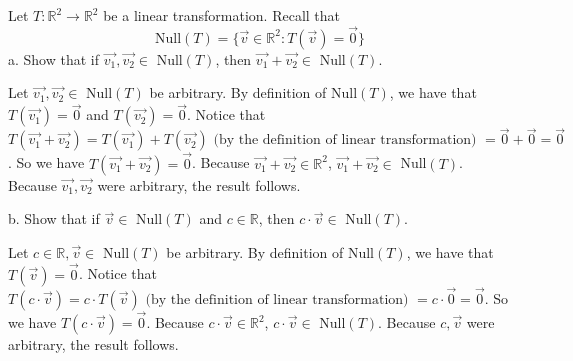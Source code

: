 \documentclass[12pt]{article}
\newenvironment{problem}[2][Problem]
{
	\begin{trivlist} 
		\item[\hskip \labelsep {\bfseries #1 #2:}]
	}
{
	\end{trivlist}
	}
\newenvironment{solution}[1][Solution]
{
	\begin{trivlist} 
		\item[\hskip \labelsep {\itshape #1:}]
	}
	{
	\end{trivlist}
}
\begin{document}
\newpage
\begin{problem}{2}
Let $T:\mathbb{R}^2 \to \mathbb{R}^2$ be a linear transformation. Recall that
\[
\text{Null}(T)=\{ \vec{v} \in \mathbb{R}^2: T(\vec{v})=\vec{0} \}
\]
\noindent
\newline
\newline
a. Show that if $\vec{v_{1}},\vec{v_{2}} \in$ Null$(T)$, then $\vec{v_{1}}+\vec{v_{2}} \in$ Null$(T)$.
\begin{solution}
Let $\vec{v_{1}},\vec{v_{2}} \in$ Null$(T)$ be arbitrary. By definition of Null$(T)$, we have that $T(\vec{v_{1}})=\vec{0}$ and $T(\vec{v_{2}})=\vec{0}$. Notice that
$T(\vec{v_{1}}+\vec{v_{2}}) = T(\vec{v_{1}}) + T(\vec{v_{2}}) \text{ (by the definition of linear transformation) } = \vec{0} + \vec{0} = \vec{0}$. So we have $T(\vec{v_{1}}+\vec{v_{2}}) = \vec{0}$. Because $\vec{v_{1}}+\vec{v_{2}} \in \mathbb{R}^2$, $\vec{v_{1}}+\vec{v_{2}} \in$ Null$(T)$. Because $\vec{v_{1}},\vec{v_{2}}$ were arbitrary, the result follows.
\end{solution}
\noindent
\newline
\newline
b. Show that if $\vec{v} \in$ Null$(T)$ and $c \in \mathbb{R}$, then $c\cdot \vec{v} \in$ Null$(T)$.
\begin{solution}
Let $c \in \mathbb{R}, \vec{v}\in$ Null$(T)$ be arbitrary. By definition of Null$(T)$, we have that $T(\vec{v})=\vec{0}$. Notice that
$T(c\cdot \vec{v}) = c\cdot T(\vec{v})  \text{ (by the definition of linear transformation) } = c\cdot \vec{0} = \vec{0}$. So we have $T(c\cdot \vec{v})  = \vec{0}$. Because $c\cdot \vec{v}  \in \mathbb{R}^2$, $c\cdot \vec{v} \in$ Null$(T)$. Because $c, \vec{v}$ were arbitrary, the result follows.

\end{solution}
\end{problem}
\end{document}
